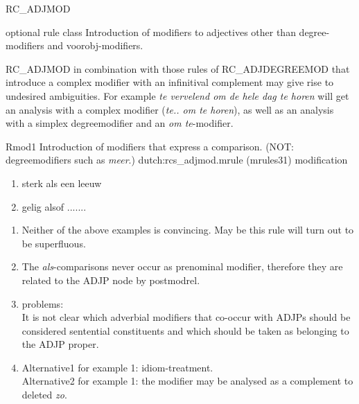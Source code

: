 \newpage
\begin{mruleclass}{RC\_ADJMOD}
\begin{classdescr}
\kind optional rule class
\classtask Introduction of modifiers to adjectives other than degree-
modifiers and voorobj-modifiers.
\nofilters

\nospeedrules

\noplannedrules

\norulesnotince

\classremarks
RC\_ADJMOD in combination with those rules 
of RC\_ADJDEGREEMOD that introduce a complex
modifier with an infinitival complement may give rise to undesired ambiguities.
For example {\em te vervelend om de hele dag te horen} will get an analysis 
with a complex modifier ({\em te.. om te horen}), as well as an analysis with
a simplex degreemodifier and an {\em om te}-modifier.
\end{classdescr}

\begin{members}

\begin{member}
 Rmod1
  Introduction of modifiers that express a comparison. (NOT: 
degreemodifiers such as {\em meer}.)
\file dutch:rcs\_adjmod.mrule (mrules31)
\semantics modification 
\example\mbox{}
\begin{enumerate}
\item sterk als een leeuw 
\item
gelig alsof .......
\end{enumerate}
\remarks\mbox{}

\begin{enumerate}
\item Neither of the above examples is convincing. May be this rule will turn out 
to be superfluous. 
\item
The {\em als}-comparisons never occur as prenominal modifier, therefore 
they are related to the ADJP node by postmodrel.
\item problems:\\ It is not clear which adverbial modifiers that co-occur with
ADJPs should be considered sentential constituents and which should be taken as 
belonging to the ADJP proper.
\item 
Alternative1 for example 1: idiom-treatment. \\
Alternative2 for example 1: the modifier may be analysed as 
a complement to deleted  {\em zo}.
\end{enumerate}


\end{member}
\end{members}
\end{mruleclass}
